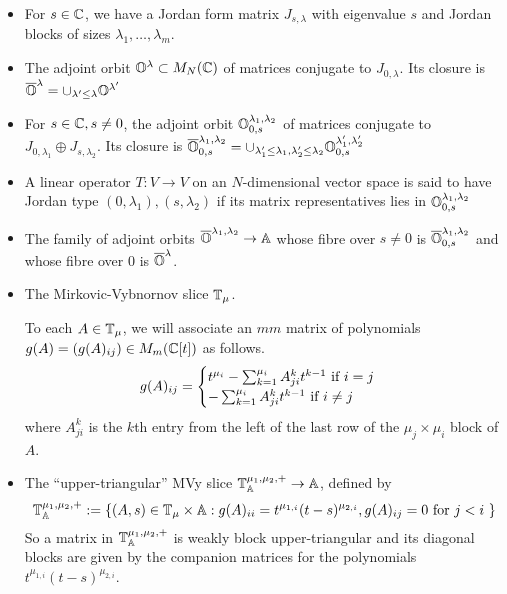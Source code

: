 \documentclass[draft]{article}
\begin{document}
\begin{itemize}
    \item For $ s \in \mathbb C$, we have a Jordan form matrix $ J_{s,\lambda}$ with eigenvalue $ s$ and Jordan blocks of sizes $ \lambda_1, \dots, \lambda_m$.
    \item The adjoint orbit $ \mathbb O^\lambda \subset M_N(\mathbb C)$ of matrices conjugate to $ J_{0,\lambda}$.  Its closure is $ \overline{\mathbb O}^\lambda = \cup_{\lambda' \le \lambda} \mathbb O^{\lambda'}$
    \item For $ s \in \mathbb C, s \ne 0$, the adjoint orbit $ \mathbb O^{\lambda_1, \lambda_2}_{0,s}$ of matrices conjugate to $ J_{0,\lambda_1} \oplus J_{s,\lambda_2}$.  Its closure is $ \overline{\mathbb O}^{\lambda_1, \lambda_2}_{0,s} = \cup_{\lambda_1' \le \lambda_1, \lambda'_2 \le \lambda_2} \mathbb O^{\lambda_1', \lambda'_2}_{0,s}$
    
    \item A linear operator $ T : V \rightarrow V $ on an $N$-dimensional vector space is said to have Jordan type $(0,\lambda_1), (s,\lambda_2)$ if its matrix representatives lies in $ \mathbb O^{\lambda_1, \lambda_2}_{0,s}$
    \item The family of adjoint orbits $ \overline{\mathbb O}^{\lambda_1, \lambda_2} \rightarrow \mathbb A$ whose fibre over $ s \ne 0 $ is $ \overline{\mathbb O}^{\lambda_1, \lambda_2}_{0,s}$ and whose fibre over 0 is $\overline{\mathbb O}^\lambda$.  
    
    \item The Mirkovic-Vybnornov slice $\mathbb T_\mu$.  
    
    To each $ A \in \mathbb T_\mu$, we will associate an $m$\times$m$ matrix of polynomials $ g(A) = \left( g(A)_{ij} \right) \in M_m(\mathbb C[t]) $ as follows.
       \begin{equation}
            g(A)_{ij} = \begin{cases} t^{\mu_i} - \sum_{k=1}^{\mu_i} A^k_{ji} t^{k-1} \text{ if $ i = j$} \\
             - \sum_{k=1}^{\mu_i} A^k_{ji} t^{k-1} \text{ if $ i \ne j$ }
        \end{cases}
    \end{equation}
    where $A^k_{ji}$ is the $k$th entry from the left of the last row of the $\mu_j\times\mu_i$ block of $A$. 
    
    \item The ``upper-triangular'' MVy slice $\mathbb T^{\mu_1, \mu_2,+}_\mathbb A \rightarrow \mathbb A $, defined by
    $$
    \mathbb T^{\mu_1, \mu_2,+}_\mathbb A := \{ (A,s) \in \mathbb T_\mu \times \mathbb A : g(A)_{ii} = t^{\mu_{1,i}} (t-s)^{\mu_{2,i}}, g(A)_{ij} = 0 \text{ for $ j < i $ }\}
    $$
    So a matrix in $\mathbb T^{\mu_1, \mu_2,+}_\mathbb A  $ is weakly block upper-triangular and its diagonal blocks are given by the companion matrices for the polynomials $t^{\mu_{1,i}} (t-s)^{\mu_{2,i}}$.
    

\end{itemize}
\end{document}
